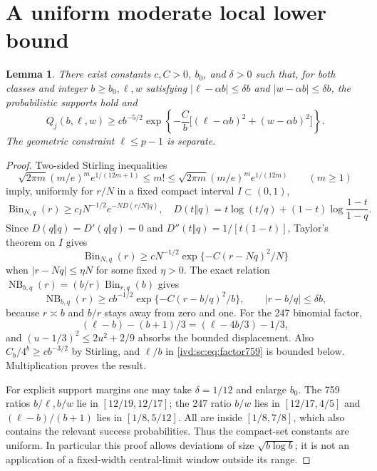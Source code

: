 \documentclass[11pt,letterpaper]{article}
\newtheorem{lemma}[theorem]{Lemma}
\theoremstyle{remark}\newtheorem{remark}[theorem]{Remark}
\numberwithin{equation}{section}
\DeclareMathOperator{\NB}{NB}\DeclareMathOperator{\Bin}{Bin}
\begin{document}
\section{A uniform moderate local lower bound}\label{ivd:sc:sec:local}
\begin{lemma}\label{ivd:sc:lem:local}
There exist constants $c,C>0$, $b_0$, and $\delta>0$ such that, for
both classes and integer $b\ge b_0,\ell,w$ satisfying
$|\ell-\alpha b|\le\delta b$ and $|w-\alpha b|\le\delta b$,
the probabilistic supports hold and
\begin{equation}\label{ivd:sc:eq:local}
 Q_j(b,\ell,w)\ge c b^{-5/2}
 \exp\left\{-\frac Cb\big[(\ell-\alpha b)^2+(w-\alpha b)^2\big]\right\}.
\end{equation}
The geometric constraint $\ell\le p-1$ is separate.
\end{lemma}
\begin{proof}
Two-sided Stirling inequalities
\[
 \sqrt{2\pi m}(m/e)^m e^{1/(12m+1)}\le m!
 \le\sqrt{2\pi m}(m/e)^m e^{1/(12m)}\qquad(m\ge1)
\]
imply, uniformly for $r/N$ in a fixed compact interval $I\subset(0,1)$,
\[
 \Bin_{N,q}(r)\ge c_I N^{-1/2}e^{-ND(r/N\Vert q)},
\quad D(t\Vert q)=t\log(t/q)+(1-t)\log\frac{1-t}{1-q}.
\]
Since $D(q\Vert q)=D'(q\Vert q)=0$ and
$D''(t\Vert q)=1/[t(1-t)]$, Taylor's theorem on $I$ gives
\begin{equation}\label{ivd:sc:eq:binlocal}
 \Bin_{N,q}(r)\ge c N^{-1/2}
 \exp\{-C(r-Nq)^2/N\}
\end{equation}
when $|r-Nq|\le\eta N$ for some fixed $\eta>0$.
The exact relation $\NB_{b,q}(r)=(b/r)\Bin_{r,q}(b)$ gives
\[
 \NB_{b,q}(r)\ge c b^{-1/2}
 \exp\{-C(r-b/q)^2/b\},\qquad |r-b/q|\le\delta b,
\]
because $r\asymp b$ and $b/r$ stays away from zero and one.
For the 247 binomial factor,
\[
 (\ell-b)-(b+1)/3=(\ell-4b/3)-1/3,
\]
and $(u-1/3)^2\le2u^2+2/9$ absorbs the bounded displacement.
Also $C_b/4^b\ge c b^{-3/2}$ by Stirling, and $\ell/b$ in
\eqref{ivd:sc:eq:factor759} is bounded below. Multiplication proves the result.

For explicit support margins one may take $\delta=1/12$ and enlarge
$b_0$. The 759 ratios $b/\ell,b/w$ lie in $[12/19,12/17]$;
the 247 ratio $b/w$ lies in $[12/17,4/5]$ and
$(\ell-b)/(b+1)$ lies in $[1/8,5/12]$. All are inside
$[1/8,7/8]$, which also contains the relevant success probabilities.
Thus the compact-set constants are uniform. In particular this proof
allows deviations of size $\sqrt{b\log b}$; it is not an application
of a fixed-width central-limit window outside its range.
\end{proof}
\end{document}
